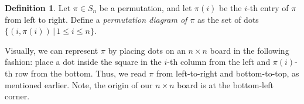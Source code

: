 \documentclass[
final
]{dmtcs-episciences}
\theoremstyle{definition}
\newtheorem{definition}[theorem]{Definition}
\newtheorem{example}[theorem]{Example}
\theoremstyle{remark}
\begin{document}
\begin{definition}
Let $\pi \in S_{n}$ be a permutation, and let $\pi(i)$ be the $i$-th entry of $\pi$ from left to right.  Define a \emph{permutation diagram of $\pi$} as the set of dots $\{(i, \pi(i))\, |\, 1 \le i \le n\}$.
\end{definition}

Visually, we can represent $\pi$ by placing dots on an $n \times n$ board in the following fashion: place a dot inside the square in the $i$-th column from the left and $\pi(i)$-th row from the bottom.  Thus, we read $\pi$ from left-to-right and bottom-to-top, as mentioned earlier.  Note, the origin of our $n \times n$ board is at the bottom-left corner.  %

%
%
%
%
%
%
%
\end{document}
